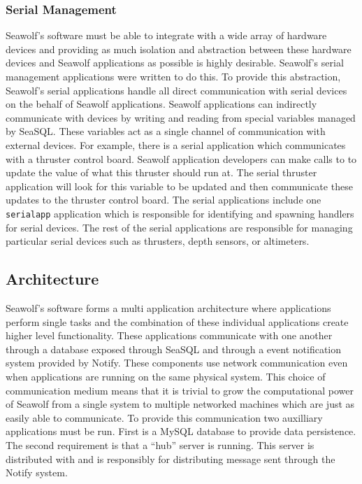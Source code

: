 \subsubsection{Serial Management} \label{serialarch}
Seawolf's software must be able to integrate with a wide array of hardware
devices and providing as much isolation and abstraction between these hardware
devices and Seawolf applications as possible is highly desirable. Seawolf's
serial management applications were written to do this. To provide this
abstraction, Seawolf's serial applications handle all direct communication with
serial devices on the behalf of Seawolf applications. Seawolf applications can
indirectly communicate with devices by writing and reading from special
variables managed by SeaSQL. These variables act as a single channel of
communication with external devices. For example, there is a serial application
which communicates with a thruster control board. Seawolf application developers
can make calls to  to update the value of what this
thruster should run at. The serial thruster application will look for this
variable to be updated and then communicate these updates to the thruster
control board. The serial applications include one \texttt{serialapp}
application which is responsible for identifying and spawning handlers for
serial devices. The rest of the serial applications are responsible for managing
particular serial devices such as thrusters, depth sensors, or altimeters.

\subsection{Architecture} \label{archarch}
Seawolf's software forms a multi application architecture where applications
perform single tasks and the combination of these individual applications create
higher level functionality. These applications communicate with one another
through a database exposed through SeaSQL and through a event notification
system provided by Notify. These components use network communication even when
applications are running on the same physical system. This choice of
communication medium means that it is trivial to grow the computational power of
Seawolf from a single system to multiple networked machines which are just as
easily able to communicate. To provide this communication two auxilliary
applications must be run. First is a MySQL database to provide data
persistence. The second requirement is that a ``hub'' server is running. This
server is distributed with \libseawolf{} and is responsibly for distributing
message sent through the Notify system.
